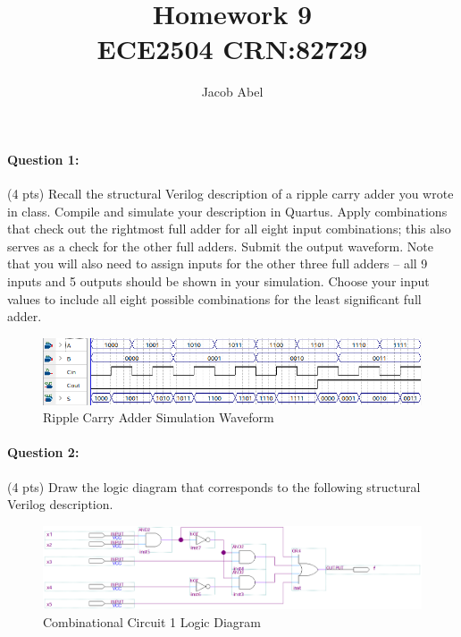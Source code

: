 \documentclass[12pt,letterpaper,titlepage]{report}
\author{Jacob Abel}
\title{%
	Homework 9
	\\\large ECE2504 CRN:82729
}
\begin{document}
\maketitle
\begin{raggedright}
\raggedcolumns
\paragraph{Question 1:}
(4 pts) Recall the structural Verilog description of a ripple carry adder you wrote in class. Compile and simulate your description in Quartus. Apply combinations that check out the rightmost full adder for all eight input combinations; this also serves as a check for the other full adders. Submit the output waveform. Note that you will also need to assign inputs for the other three full adders – all 9 inputs and 5 outputs should be shown in your simulation. Choose your input values to include all eight possible combinations for the least significant full adder.
\begin{figure}[ht]
\centering
\includegraphics[width=\textwidth, height=\textheight, keepaspectratio=true]{hw9p1}
\caption{Ripple Carry Adder Simulation Waveform}
\end{figure}


\clearpage

\paragraph{Question 2:}
(4 pts) Draw the logic diagram that corresponds to the following structural Verilog description. 


\begin{figure}[ht]
\centering
\includegraphics[width=\textwidth, height=\textheight, keepaspectratio=true]{hw9p2}
\caption{Combinational Circuit 1 Logic Diagram}
\end{figure}


\end{raggedright}
\end{document}
